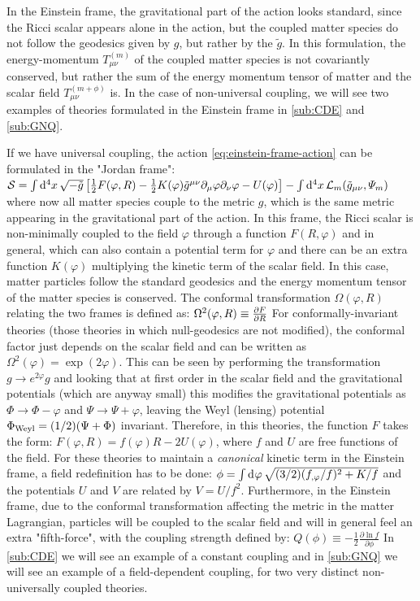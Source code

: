 In the Einstein frame, the gravitational part of the action looks standard, since the Ricci scalar appears alone in the action,
but the coupled matter species do not follow the geodesics given by $g$, but rather by the $\tilde g$. 
In this formulation, the energy-momentum $T^{(m)}_{\mu \nu}$ of the coupled matter species is not covariantly conserved, but rather
the sum of the energy momentum tensor of matter and the scalar field $T^{(m+\phi)}_{\mu \nu}$ is.
In the case of non-universal coupling, we will see two examples of theories formulated in the Einstein frame in \cref{sub:CDE} and \cref{sub:GNQ}.

If we have universal coupling, the action \cref{eq:einstein-frame-action} can be formulated in the "Jordan frame":
\beeqc$\label{eq:jordan-frame-action}
\mathcal{S} = \int \mathrm{d}^{4} {x} \, \sqrt{-\tilde{g}} \left[  \frac{1}{2} F(\varphi, R) - \frac{1}{2} K(\varphi) \tilde{g}^{\mu \nu}  \partial_{\mu}\varphi \partial_{\nu}\varphi 
- U(\varphi)    \right] - \int \mathrm{d}^{4} {x} \, \mathcal{L}_m (\tilde{g}_{\mu \nu} , \varPsi_m )
$
where now all matter species couple to the metric $g$, which is the same metric appearing in the gravitational part of the action.
In this frame, the Ricci scalar is non-minimally coupled to the field $\varphi$ through a function $F(R, \varphi)$ and in general, 
which can also contain a potential term for $\varphi$ and there can be an extra function $K(\varphi)$ multiplying the kinetic term of the scalar field.
In this case, matter particles follow the standard geodesics and the energy momentum tensor of the matter species is conserved.
The conformal transformation $\Omega(\varphi,R)$ relating the two frames is defined as:
\beeqp$
\Omega^2(\varphi,R) \equiv \frac{\partial{F}}{\partial{R}} 
$
For conformally-invariant theories (those theories in which null-geodesics are not modified), the conformal factor
just depends on the scalar field and can be written as $\Omega^2(\varphi)=\exp(2\varphi)$. 
This can be seen by performing the transformation $g \rightarrow e^{2\varphi} g$ and 
looking that at first order in the
scalar field and the gravitational potentials (which are anyway small)
this modifies the gravitational potentials as $\Phi \rightarrow \Phi-\varphi$ and $\Psi \rightarrow \Psi+\varphi$, leaving 
the Weyl (lensing) potential $\Phi_{\rm Weyl} = (1/2)(\Psi + \Phi)$ invariant.
Therefore, in this theories, the function $F$ takes the form: $F(\varphi, R) = f(\varphi)R-2U(\varphi)$, where
$f$ and $U$ are free functions of the field.
For these theories to maintain a \emph{canonical} kinetic term in the Einstein frame, a field redefinition has to be done:
\beeq$
\phi = \int \mathrm{d}^{} {\varphi} \, \sqrt{(3/2)(f_{,\varphi}/f)^2 + K/f}
$
and the potentials $U$ and $V$ are related by $V = U/f^2$.
Furthermore, in the Einstein frame, due to the conformal transformation affecting the metric in the matter Lagrangian,
particles will be coupled to the scalar field and will in general feel an extra "fifth-force", with the coupling strength
defined by:
\beeqp$\label{eq:definition-of-coupling-Q}
Q(\phi) \equiv -\frac{1}{2}\frac{\partial \ln f}{\partial \phi}
$
In \cref{sub:CDE} we will see an example of a constant coupling and in \cref{sub:GNQ} we will see an example of a field-dependent coupling, 
for two very distinct non-universally coupled theories.

